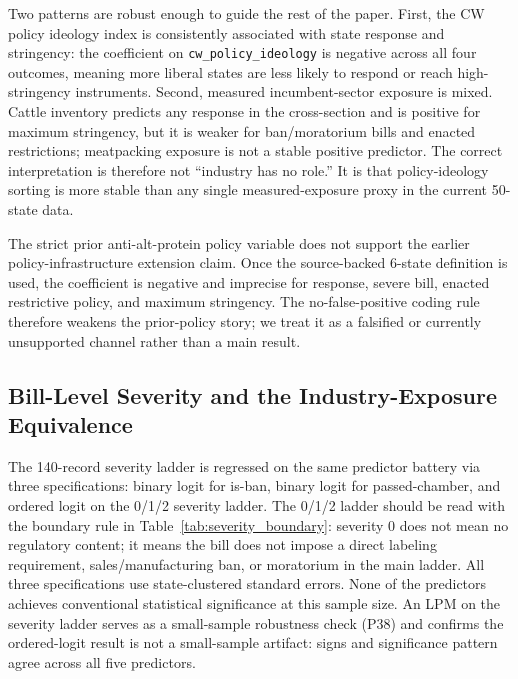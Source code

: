 \documentclass[12pt]{article}
\begin{document}
Two patterns are robust enough to guide the rest of the paper.  First, the CW policy ideology index is consistently associated with state response and stringency: the coefficient on \texttt{cw\_policy\_ideology} is negative across all four outcomes, meaning more liberal states are less likely to respond or reach high-stringency instruments.  Second, measured incumbent-sector exposure is mixed.  Cattle inventory predicts any response in the cross-section and is positive for maximum stringency, but it is weaker for ban/moratorium bills and enacted restrictions; meatpacking exposure is not a stable positive predictor.  The correct interpretation is therefore not ``industry has no role.''  It is that policy-ideology sorting is more stable than any single measured-exposure proxy in the current 50-state data.

The strict prior anti-alt-protein policy variable does not support the earlier policy-infrastructure extension claim.  Once the source-backed 6-state definition is used, the coefficient is negative and imprecise for response, severe bill, enacted restrictive policy, and maximum stringency.  The no-false-positive coding rule therefore weakens the prior-policy story; we treat it as a falsified or currently unsupported channel rather than a main result.

\subsection{Bill-Level Severity and the Industry-Exposure Equivalence}
\label{sec:results_billlevel}

The 140-record severity ladder is regressed on the same predictor battery via three specifications: binary logit for is-ban, binary logit for passed-chamber, and ordered logit on the 0/1/2 severity ladder.  The 0/1/2 ladder should be read with the boundary rule in Table~\ref{tab:severity_boundary}: severity 0 does not mean no regulatory content; it means the bill does not impose a direct labeling requirement, sales/manufacturing ban, or moratorium in the main ladder.  All three specifications use state-clustered standard errors.  None of the predictors achieves conventional statistical significance at this sample size.  An LPM on the severity ladder serves as a small-sample robustness check (P38) and confirms the ordered-logit result is not a small-sample artifact: signs and significance pattern agree across all five predictors.
\end{document}
